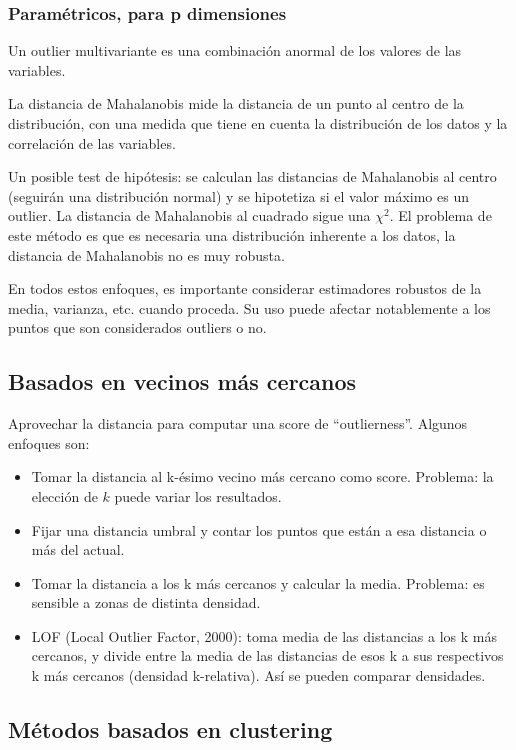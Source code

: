 \documentclass[a4paper,11pt,spanish]{report}
\let\stdsub\subsection
\let\stdsubsub\subsubsection
\renewcommand{\section}{\stdsub}
\renewcommand{\subsection}{\stdsubsub}
\begin{document}
\subsection*{Paramétricos, para p dimensiones}
\label{sec-2-4-1-4}
Un outlier multivariante es una combinación anormal de los valores de las variables.

La distancia de Mahalanobis mide la distancia de un punto al centro de la distribución, con una medida que tiene en cuenta la distribución de los datos y la correlación de las variables.

Un posible test de hipótesis: se calculan las distancias de Mahalanobis al centro (seguirán una distribución normal) y se hipotetiza si el valor máximo es un outlier. La distancia de Mahalanobis al cuadrado sigue una $\chi^2$. El problema de este método es que es necesaria una distribución inherente a los datos, la distancia de Mahalanobis no es muy robusta.

En todos estos enfoques, es importante considerar estimadores robustos de la media, varianza, etc. cuando proceda. Su uso puede afectar notablemente a los puntos que son considerados outliers o no.

\section{Basados en vecinos más cercanos}
\label{sec-2-4-2}

Aprovechar la distancia para computar una score de ``outlierness''. Algunos enfoques son:

\begin{itemize}
\item Tomar la distancia al k-ésimo vecino más cercano como score. Problema: la elección de $k$ puede variar los resultados.
\item Fijar una distancia umbral y contar los puntos que están a esa distancia o más del actual.
\item Tomar la distancia a los k más cercanos y calcular la media. Problema: es sensible a zonas de distinta densidad.
\item LOF (Local Outlier Factor, 2000): toma media de las distancias a los k más cercanos, y divide entre la media de las distancias de esos k a sus respectivos k más cercanos (densidad k-relativa). Así se pueden comparar densidades.
\end{itemize}

\section{Métodos basados en clustering}
\label{sec-2-4-3}
\end{document}
